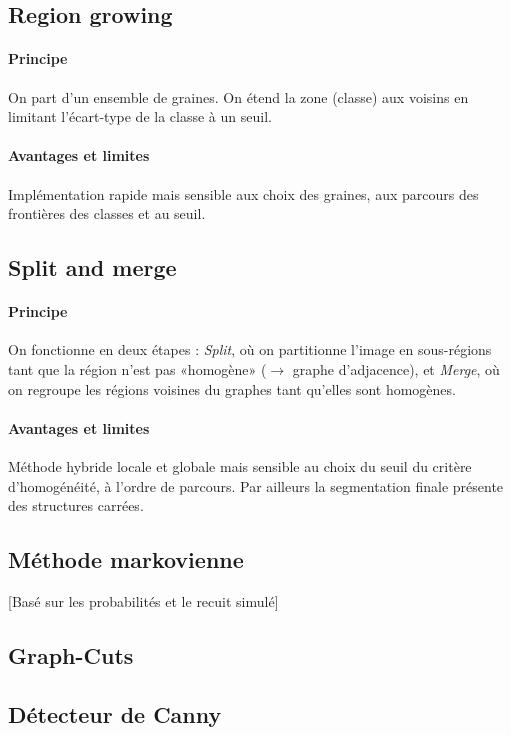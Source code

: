 \documentclass[french]{article}
\begin{document}
\subsection{Region growing}

\paragraph{Principe} On part d'un ensemble de graines. On étend la zone
(classe) aux voisins en limitant l'écart-type de la classe à un seuil.

\paragraph{Avantages et limites}Implémentation rapide mais sensible aux
choix des graines, aux parcours des frontières des classes et au seuil.

\subsection{Split and merge}

\paragraph{Principe} On fonctionne en deux étapes : \emph{Split}, où on
partitionne l'image en sous-régions tant que la région n'est pas «homogène»
($\to$ graphe d'adjacence), et \emph{Merge}, où on regroupe les régions
voisines du graphes tant qu'elles sont homogènes.

\paragraph{Avantages et limites} Méthode hybride locale et globale mais
sensible au choix du seuil du critère d'homogénéité, à l'ordre de parcours.
Par ailleurs la segmentation finale présente des structures carrées.

\subsection{Méthode markovienne}
[Basé sur les probabilités et le recuit simulé]
\subsection{Graph-Cuts}
\subsection{Détecteur de Canny}
\end{document}
